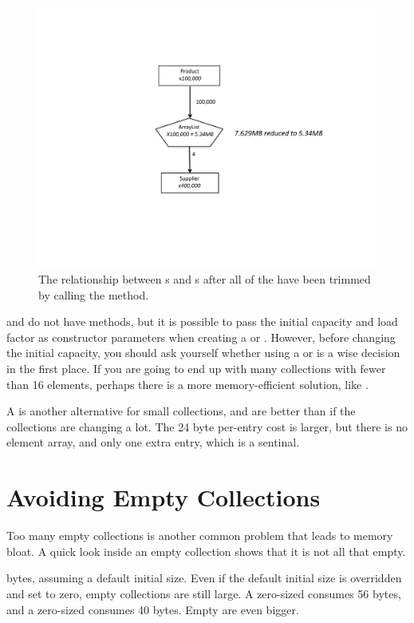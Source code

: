  \begin{figure}
  \centering
 \includegraphics[width=.80\textwidth]{part1/Figures/collections/trimmed-product.pdf}
 \caption{The relationship between s and s after
 all of the
  have been trimmed by calling the  method.}
  \label{fig:trimmed-product}
\end{figure}
 
 and  do not have  methods,
but it is possible to pass the initial capacity and load factor as constructor
parameters when creating a  or . 
However, before changing the initial capacity, you should
ask yourself whether using a  or  is a
wise decision in the first place. If you are going to end up with many
collections with fewer than 16 elements, perhaps there is a more memory-efficient solution, like
.
  
A  is another alternative for small collections, and are
better than  if the collections are changing a lot. The
24 byte per-entry cost is larger, but there is no element array, and only one
extra entry, which is a sentinal.

\section{Avoiding Empty Collections}

Too many empty collections is another common problem that leads to memory bloat.
A quick look inside an empty collection shows that it is not all that empty. 

bytes, assuming a default initial size. 
Even if the default initial size is overridden and set to zero, empty
collections are still large. A zero-sized  consumes 56 bytes, and a zero-sized
 consumes 40 bytes. Empty  are even bigger.

